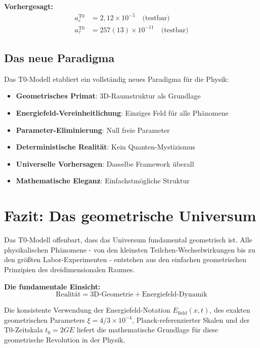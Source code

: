 \documentclass[12pt,a4paper]{report}
\begin{document}
	\textbf{Vorhergesagt:}
	\begin{align}
		a_e^{\text{T0}} &= 2,12 \times 10^{-5} \quad \text{(testbar)} \\
		a_\tau^{\text{T0}} &= 257(13) \times 10^{-11} \quad \text{(testbar)}
	\end{align}
	
	\subsection{Das neue Paradigma}
	\label{subsec:new_paradigm}
	
	Das T0-Modell etabliert ein vollständig neues Paradigma für die Physik:
	
	\begin{itemize}
		\item \textbf{Geometrisches Primat}: 3D-Raumstruktur als Grundlage
		\item \textbf{Energiefeld-Vereinheitlichung}: Einziges Feld für alle Phänomene
		\item \textbf{Parameter-Eliminierung}: Null freie Parameter
		\item \textbf{Deterministische Realität}: Kein Quanten-Mystizismus
		\item \textbf{Universelle Vorhersagen}: Dasselbe Framework überall
		\item \textbf{Mathematische Eleganz}: Einfachstmögliche Struktur
	\end{itemize}
	
	\section{Fazit: Das geometrische Universum}
	\label{sec:conclusion_geometric_universe}
	
	Das T0-Modell offenbart, dass das Universum fundamental geometrisch ist. Alle physikalischen Phänomene - von den kleinsten Teilchen-Wechselwirkungen bis zu den größten Labor-Experimenten - entstehen aus den einfachen geometrischen Prinzipien des dreidimensionalen Raumes.
	
	\textbf{Die fundamentale Einsicht:}
	\begin{equation}
		\text{Realität} = \text{3D-Geometrie} + \text{Energiefeld-Dynamik}
	\end{equation}
	
	Die konsistente Verwendung der Energiefeld-Notation $E_{\text{field}}(x,t)$, des exakten geometrischen Parameters $\xi = 4/3 \times 10^{-4}$, Planck-referenzierter Skalen und der T0-Zeitskala $t_0 = 2GE$ liefert die mathematische Grundlage für diese geometrische Revolution in der Physik.
	
\end{document}
